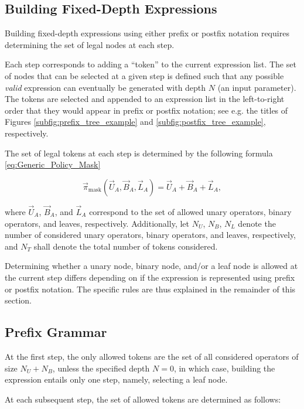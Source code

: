 \documentclass[12pt]{iopart}
\begin{document}
\subsection{Building Fixed-Depth Expressions}
Building fixed-depth expressions using either prefix or postfix notation requires determining the set of legal nodes at each step. 
\par Each step corresponds to adding a ``token'' to the current expression list. The set of nodes that can be selected at a given step is defined such that any possible \emph{valid} expression can eventually be generated with depth $N$ (an input parameter). The tokens are selected and appended to an expression list in the left-to-right order that they would appear in prefix or postfix notation; see e.g. the titles of Figures \ref{subfig:prefix_tree_example} and \ref{subfig:postfix_tree_example}, respectively. 
\par The set of legal tokens at each step is determined by the following formula \ref{eq:Generic_Policy_Mask}

\begin{equation}
    \vec{\pi}_{\mathrm{mask}} \left(\vec{U}_{A}, \vec{B}_{A}, \vec{L}_{A}\right) = 
\vec{U}_{A}  + \vec{B}_{A} +\vec{L}_{A},
\label{eq:Generic_Policy_Mask}
\end{equation}

where $\vec{U}_{A}$, $ \vec{B}_{A}$, and $\vec{L}_{A}$ correspond to the set of allowed unary operators, binary operators, and leaves, respectively. Additionally, let $N_U$, $N_B$, $N_L$ denote the number of considered unary operators, binary operators, and leaves, respectively,  and $N_{T}$ shall denote the total number of tokens considered.

Determining whether a unary node, binary node, and/or a leaf node is allowed at the current step differs depending on if the expression is represented using prefix or postfix notation. The specific rules are thus explained in the remainder of this section.

\subsection{Prefix Grammar}\label{subsec:prefix_grammar}
At the first step, the only allowed tokens are the set of all considered operators of size $N_U + N_B$, unless the specified depth $N=0$, in which case, building the expression entails only one step, namely, selecting a leaf node.
\par At each subsequent step, the set of allowed tokens are determined as follows:
\end{document}
